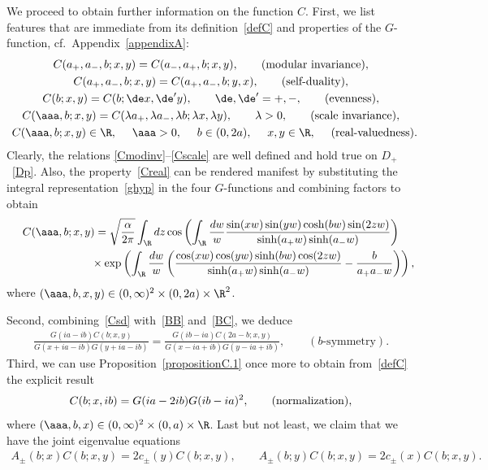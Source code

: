 We proceed to obtain further information on the function $C$. First, we list features that are immediate from its def\/inition~\eqref{defC} and properties of the $G$-function, cf.~Appendix~\ref{appendixA}:
\begin{gather}\label{Cmodinv}
C(a_{+},a_{-},b;x,y)=C(a_{-},a_{+},b;x,y),\qquad  ({\rm modular\  invariance}),
\\
\label{Csd}
C(a_{+},a_{-},b;x,y)=C(a_{+},a_{-},b;y,x),\qquad  (\mbox{self-duality}),
\\
\label{Ceven}
C(b;x,y)=C(b;\de x, \de'y),\qquad \de,\de'=+,-,\qquad ({\rm evenness}),
\\
\label{Cscale}
C(\aaa,b;x,y)=C(\lambda  a_{+},\lambda a_{-}, \lambda b;\lambda x,\lambda y),\qquad \lambda>0,\qquad ({\rm scale\ invariance}),
\\
\label{Creal}
C(\aaa,b;x,y)\in\R,\!\!\!\!\qquad  \aaa>0,\!\!\!\!\qquad b\in(0,2a),\!\!\!\!\qquad x,y\in\R,\!\!\!\!\qquad \mbox{(real-valuedness)}.\!\!\!\!
\end{gather}
Clearly, the relations \eqref{Cmodinv}--\eqref{Cscale} are well def\/ined and hold true on $D_+$~\eqref{Dp}.  Also, the property~\eqref{Creal} can be rendered manifest by substituting the integral representation~\eqref{ghyp} in the four $G$-functions and combining factors to obtain
\begin{gather}
C(\aaa,b;x,y)=  \sqrt{\frac{\alpha}{2\pi}}  \int_{\R}dz\cos\left( \int_{\R}\frac{dw}{w}\frac{\sin(xw)\sin(yw)\cosh(bw)\sin(2zw)}{\sinh(a_{+}w)\sinh(a_-w)}\right)  \\
\phantom{C(\aaa,b;x,y)=}{}  \times \exp\left( \int_{\R}\frac{dw}{w}\left(\frac{\cos(xw)\cos(yw)\sinh(bw)\cos(2zw)}{\sinh(a_{+}w)\sinh(a_-w)}-\frac{b}{a_+a_-w}\right)\right),  \nonumber
\end{gather}
  where $(\aaa,b,x,y)\in(0,\infty)^2\times(0,2a)\times\R^2$.

Second, combining~\eqref{Csd} with~\eqref{BB} and~\eqref{BC}, we deduce
\begin{gather}\label{Cbsym}
\frac{G(ia-ib)C(b;x,y)}{G(x+ia-ib)G(y+ia-ib)}=
\frac{G(ib-ia)C(2a-b;x,y)}{G(x-ia+ib)G(y-ia+ib)},\qquad (b\mbox{-symmetry}).
\end{gather}
Third, we can use Proposition~\ref{propositionC.1} once more to obtain from~\eqref{defC} the explicit result
\begin{gather}\label{Cnorm}
C(b;x,ib)=G(ia-2ib)G(ib-ia)^2,\qquad ({\rm normalization}),
\end{gather}
where $(\aaa,b,x)\in(0,\infty)^2\times (0,a)\times \R$.
Last but not least, we claim that we have the joint eigenvalue equations
\begin{gather}\label{Cades}
A_{\pm}(b;x)C(b;x,y)=2c_{\pm}(y)C(b;x,y),\qquad A_{\pm}(b;y)C(b;x,y)=2c_{\pm}( x)C(b;x,y).
\end{gather}


